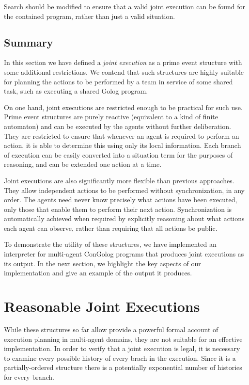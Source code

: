 Search should be modified to ensure that a valid joint execution can
be found for the contained program, rather than just a valid situation.


\subsection{Summary\label{sec:JointExec:Summary}}

In this section we have defined a \emph{joint execution} as a prime
event structure with some additional restrictions. We contend that
such structures are highly suitable for planning the actions to be
performed by a team in service of some shared task, such as executing
a shared Golog program.

On one hand, joint executions are restricted enough to be practical
for such use. Prime event structures are purely reactive (equivalent
to a kind of finite automaton) and can be executed by the agents without
further deliberation. They are restricted to ensure that whenever
an agent is required to perform an action, it is able to determine
this using only its local information. Each branch of execution can
be easily converted into a situation term for the purposes of reasoning,
and can be extended one action at a time.

Joint executions are also significantly more flexible than previous
approaches. They allow independent actions to be performed without
synchronization, in any order. The agents need never know precisely
what actions have been executed, only those that enable them to perform
their next action. Synchronization is automatically achieved when
required by explicitly reasoning about what actions each agent can
observe, rather than requiring that all actions be public.

To demonstrate the utility of these structures, we have implemented
an interpreter for multi-agent ConGolog programs that produces joint
executions as its output. In the next section, we highlight the key
aspects of our implementation and give an example of the output it
produces.


\section{Reasonable Joint Executions}

While these structures so far allow provide a powerful formal account
of execution planning in multi-agent domains, they are not suitable
for an effective implementation. In order to verify that a joint execution
is legal, it is necessary to examine every possible history of every
brach in the execution. Since it is a partially-ordered structure
there is a potentially exponential number of histories for every branch.


